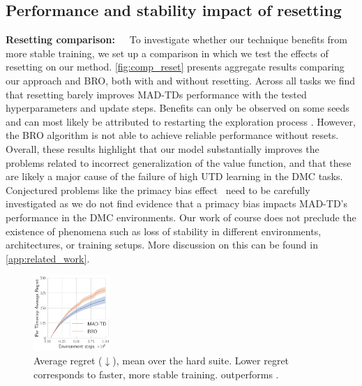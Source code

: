 \subsection{Performance and stability impact of resetting}


\textbf{Resetting comparison:}~~~To investigate whether our technique benefits from more stable training, we set up a comparison in which we test the effects of resetting on our method. \autoref{fig:comp_reset} presents aggregate results comparing our approach and BRO, both with and without resetting. 
Across all tasks we find that resetting barely improves MAD-TDs performance with the tested hyperparameters and update steps.
Benefits can only be observed on some seeds and can most likely be attributed to restarting the exploration process \parencite{hussing2024dissecting}.
However, the BRO algorithm is not able to achieve reliable performance without resets.
Overall, these results highlight that our model substantially improves the problems related to incorrect generalization of the value function, and that these are likely a major cause of the failure of high UTD learning in the DMC tasks.
Conjectured problems like the primacy bias effect~\parencite{nikishin2022primacy} need to be carefully investigated as we do not find evidence that a primacy bias impacts MAD-TD's performance in the DMC environments. 
Our work of course does not preclude the existence of phenomena such as loss of stability in different environments, architectures, or training setups. More discussion on this can be found in \autoref{app:related_work}.
\begin{figure}
    \centering
    \includegraphics[width=0.26\textwidth]{figures/mad-td/average_regret_all_envs.pdf}
    \caption{Average regret ($\downarrow$), mean over the hard suite. Lower regret corresponds to faster, more stable training.  outperforms .}
    \label{fig:regret}    
\end{figure}

